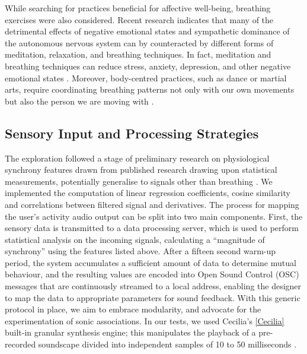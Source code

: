 While searching for practices beneficial for affective well-being, breathing exercises were also considered. Recent research indicates that many of the detrimental effects of negative emotional states and sympathetic dominance of the autonomous nervous system can by counteracted by different forms of meditation, relaxation, and breathing techniques. In fact, meditation and breathing techniques can reduce stress, anxiety, depression, and other negative emotional states \cite{brown_sudarshan_2005,descilo_effects_2010,regulation_2015}. Moreover, body-centred practices, such as dance or martial arts, require coordinating breathing patterns not only with our own movements but also the person we are moving with \cite{codrons_spontaneous_2014}.

\subsection*{Sensory Input and Processing Strategies}


The exploration followed a stage of preliminary research on physiological synchrony features drawn from published research drawing upon statistical measurements, potentially generalise to signals other than breathing \cite{zamm_endogenous_2016}. We implemented the computation of linear regression coefficients, cosine similarity and correlations between filtered signal and derivatives. The process for mapping the user’s activity audio output can be split into two main components. First, the sensory data is transmitted to a data processing server, which is used to perform statistical analysis on the incoming signals, calculating a “magnitude of synchrony” using the features listed above. After a fifteen second warm-up period, the system accumulates a sufficient amount of data to determine mutual behaviour, and the resulting values are encoded into Open Sound Control (OSC) messages that are continuously streamed to a local address, enabling the designer to map the data to appropriate parameters for sound feedback. With this generic protocol in place, we aim to embrace modularity, and advocate for the experimentation of sonic associations. In our tests, we used Cecilia’s \ref{Cecilia} built-in granular synthesis engine; this manipulates the playback of a pre-recorded soundscape divided into independent samples of 10 to 50 milliseconds \cite{roads_introduction_1988}.

